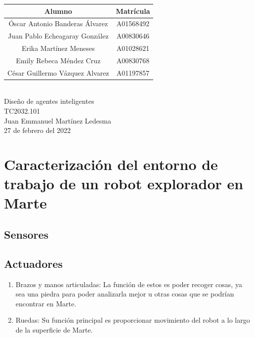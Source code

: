 \documentclass{article}
\begin{document}
\begin{titlepage}
\begin{center}
        \begin{tabular}{|| c | c ||}
            \hline
            Alumno & Matrícula \\
            \hline
            Óscar Antonio Banderas Álvarez  & A01568492 \\
            \hline
            Juan Pablo Echeagaray González & A00830646 \\
            \hline
            Erika Martínez Meneses & A01028621 \\
            \hline
            Emily Rebeca Méndez Cruz & A00830768 \\
            \hline
            César Guillermo Vázquez Alvarez & A01197857 \\
            \hline
        \end{tabular} \\
        \vspace{0.7cm}
        Diseño de agentes inteligentes\\ %
        \vspace{0.2cm}
        TC2032.101\\ %
        \vspace{0.2cm}
        Juan Emmanuel Martínez Ledesma \\ %
        \vspace{0.7cm}
        27 de febrero del 2022 \\ %
        \end{center}
    \end{titlepage}

    \section{Caracterización del entorno de trabajo de un robot explorador en Marte}
        
        \subsection{Sensores}
    
        \subsection{Actuadores}
            \begin{enumerate}
                \item Brazos y manos articuladas: La función de estos es poder recoger cosas, ya sea una piedra para poder analizarla mejor u otras cosas que se podrían encontrar en Marte. 
                \item Ruedas: Su función principal es proporcionar movimiento del robot a lo largo de la superficie de Marte.
            \end{enumerate}
\end{document}
